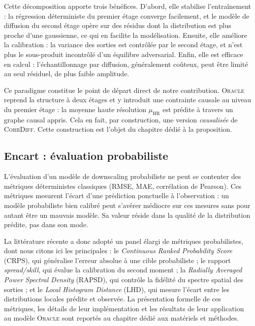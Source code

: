 \documentclass[14pt,a4paper,openany]{extreport}
\theoremstyle{definition}
\newcommand{\Oracle}{\textsc{Oracle}}
\newcommand{\CorrDiff}{\textsc{CorrDiff}}
\newcommand{\HR}{\ensuremath{\text{HR}}}
\newcommand{\muHR}{\ensuremath{\mu_{\HR}}}
\begin{document}
Cette décomposition apporte trois bénéfices. D'abord, elle stabilise l'entraînement : la régression déterministe du premier étage converge facilement, et le modèle de diffusion du second étage opère sur des résidus dont la distribution est plus proche d'une gaussienne, ce qui en facilite la modélisation. Ensuite, elle améliore la calibration : la variance des sorties est contrôlée par le second étage, et n'est plus le sous-produit incontrôlé d'un équilibre adversarial. Enfin, elle est efficace en calcul : l'échantillonnage par diffusion, généralement coûteux, peut être limité au seul résiduel, de plus faible amplitude.

Ce paradigme constitue le point de départ direct de notre contribution. \Oracle{} reprend la structure à deux étages et y introduit une contrainte causale au niveau du premier étage : la moyenne haute résolution $\muHR$ est prédite à travers un graphe causal appris. Cela en fait, par construction, une version \emph{causalisée} de \CorrDiff{}. Cette construction est l'objet du chapitre dédié à la proposition.

\subsection{Encart : évaluation probabiliste}
\label{ssec:eval-encart}

L'évaluation d'un modèle de downscaling probabiliste ne peut se contenter des métriques déterministes classiques (RMSE, MAE, corrélation de Pearson). Ces métriques mesurent l'écart d'une prédiction ponctuelle à l'observation : un modèle probabiliste bien calibré peut s'avérer médiocre sur ces mesures sans pour autant être un mauvais modèle. Sa valeur réside dans la qualité de la distribution prédite, pas dans son mode.

La littérature récente a donc adopté un panel élargi de métriques probabilistes, dont nous citons ici les principales : le \emph{Continuous Ranked Probability Score} (CRPS), qui généralise l'erreur absolue à une cible probabiliste ; le rapport \emph{spread/skill}, qui évalue la calibration du second moment ; la \emph{Radially Averaged Power Spectral Density} (RAPSD), qui contrôle la fidélité du spectre spatial des sorties ; et le \emph{Local Histogram Distance} (LHD), qui mesure l'écart entre les distributions locales prédite et observée. La présentation formelle de ces métriques, les détails de leur implémentation et les résultats de leur application au modèle \Oracle{} sont reportés au chapitre dédié aux matériels et méthodes.
\end{document}
